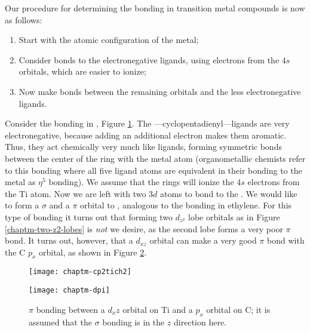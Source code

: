 Our procedure for determining the bonding in transition metal
compounds is now as follows:
\begin{enumerate}
\item Start with the atomic configuration of the metal;
\item Consider bonds to the electronegative ligands, using electrons
  from the $4s$ orbitals, which are easier to ionize;
\item Now make bonds between the remaining orbitals and the less
  electronegative ligands.
\end{enumerate}
Consider the bonding in , Figure
\ref{chaptm-cp2tich2}. The ---cyclopentadienyl---ligands are
very electronegative, because adding an additional electron makes them
aromatic. Thus, they act chemically very much like  ligands,
forming symmetric bonds between the center of the ring with the metal
atom (organometallic chemists refer to this bonding where all five
ligand atoms are equivalent in their bonding to the metal as $\eta^5$
bonding). We assume that the  rings will ionize the $4s$
electrons from the Ti atom. Now we are left with two $3d$ atoms to
bond to the . We would like to form a $\sigma$ and a $\pi$
orbital to , analogous to the bonding in ethylene. For this
type of bonding it turns out that forming two $d_{z^2}$ lobe orbitals
as in Figure \ref{chaptm-two-z2-lobes} is \emph{not} we desire, as the
second lobe forms a very poor $\pi$ bond. It turns out, however, that
a $d_{xz}$ orbital can make a very good $\pi$ bond with the C $p_x$
orbital, as shown in Figure \ref{chaptm-dpi}.

\begin{figure}
\begin{center}
\texttt{[image: chaptm-cp2tich2]}
\end{center}
\caption{}
\label{chaptm-cp2tich2}
\end{figure}

\begin{figure}
\begin{center}
\texttt{[image: chaptm-dpi]}
\end{center}
\caption{$\pi$ bonding between a $d_xz$ orbital on Ti and a $p_x$
  orbital on C; it is assumed that the $\sigma$ bonding is in the $z$
  direction here.}
\label{chaptm-dpi}
\end{figure}


